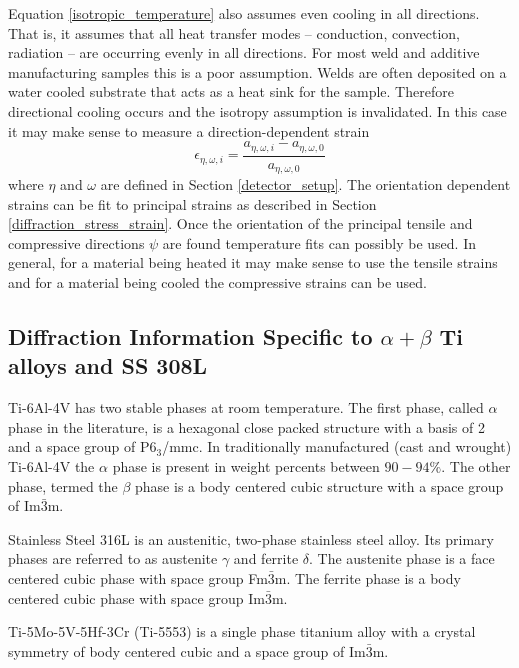 Equation \ref{isotropic_temperature} also assumes even cooling in all directions. That is, it assumes that all heat transfer modes -- conduction, convection, radiation -- are occurring evenly in all directions. For most weld and additive manufacturing samples this is a poor assumption. Welds are often deposited on a water cooled substrate that acts as a heat sink for the sample. Therefore directional cooling occurs and the isotropy assumption is invalidated. In this case it may make sense to measure a direction-dependent strain
\begin{equation}
	\epsilon_{\eta,\omega,i} = \frac{a_{\eta,\omega,i} - a_{\eta,\omega,0}}{a_{\eta,\omega,0}}
	\label{directional_strain}
\end{equation}
where $\eta$ and $\omega$ are defined in Section \ref{detector_setup}. The orientation dependent strains can be fit to principal strains as described in Section \ref{diffraction_stress_strain}. Once the orientation of the principal tensile and compressive directions $\psi$ are found temperature fits can possibly be used. In general, for a material being heated it may make sense to use the tensile strains and for a material being cooled the compressive strains can be used.

\subsection{Diffraction Information Specific to $\alpha + \beta$ Ti alloys and SS 308L}
Ti-6Al-4V has two stable phases at room temperature. The first phase, called $\alpha$ phase in the literature, is a hexagonal close packed structure with a basis of 2 and a space group of P6$_3$/mmc. In traditionally manufactured (cast and wrought) Ti-6Al-4V the $\alpha$ phase is present in weight percents between $90-94\%$. The other phase, termed the $\beta$ phase is a body centered cubic structure with a space group of Im$\bar3$m.

Stainless Steel 316L is an austenitic, two-phase stainless steel alloy. Its primary phases are referred to as austenite $\gamma$ and ferrite $\delta$. The austenite phase is a face centered cubic phase with space group Fm$\bar3$m. The ferrite phase is a body centered cubic phase with space group Im$\bar3$m.

Ti-5Mo-5V-5Hf-3Cr (Ti-5553) is a single phase titanium alloy with a crystal symmetry of body centered cubic and a space group of Im$\bar3$m. 

